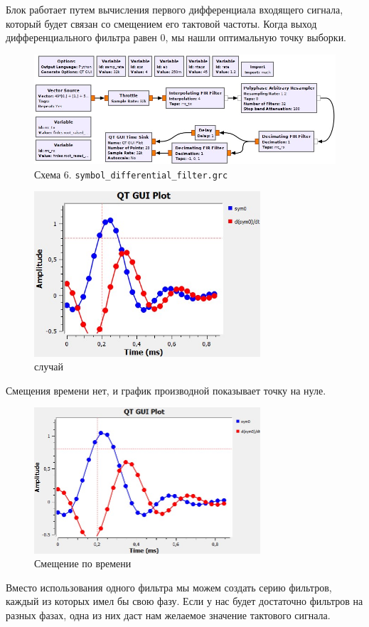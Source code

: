 \documentclass[a4paper, 12pt]{report}
\begin{document}
	Блок работает путем вычисления первого дифференциала входящего сигнала, который будет связан со смещением его тактовой частоты. Когда выход дифференциального фильтра равен 0, мы нашли оптимальную точку выборки.
	\begin{figure}[H]
		\centering
		\includegraphics[width=1.0\textwidth]{14.jpg}
		\caption{Схема 6. \texttt{symbol\_differential\_filter.grc}}
		\label{fig:14}
	\end{figure}
	\begin{figure}[H]
		\centering
		\includegraphics[width=0.75\textwidth]{15.jpg}
		\caption{ случай}
		\label{fig:15}
	\end{figure}
	Смещения времени нет, и график производной показывает точку на нуле.
	\begin{figure}[H]
		\centering
		\includegraphics[width=0.75\textwidth]{16.jpg}
		\caption{Смещение по времени}
		\label{fig:16}
	\end{figure}
	Вместо использования одного фильтра мы можем создать серию фильтров, каждый из которых имел бы свою фазу. Если у нас будет достаточно фильтров на разных фазах, одна из них даст нам желаемое значение тактового сигнала.
	
\end{document}
